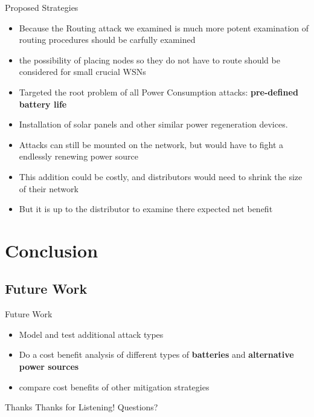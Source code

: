 \documentclass{beamer}
\begin{document}
\begin{frame}{Proposed Strategies}

\begin{itemize}

	\item Because the Routing attack we examined is much more potent examination of routing procedures should be carfully examined
	\item the possibility of placing nodes so they do not have to route should be considered for small crucial WSNs
	\item Targeted the root problem of all Power Consumption attacks: \textbf{pre-defined battery life}
	\item Installation of solar panels and other similar power regeneration devices.
	\item Attacks can still be mounted on the network, but would have to fight a endlessly renewing power source 
	\item This addition could be costly, and distributors would need to shrink the size of their network
	\item But it is up to the distributor to examine there expected net benefit
	
\end{itemize}

\end{frame}

\section{Conclusion}

\subsection{Future Work}
\begin{frame}{Future Work}
\begin{itemize}

	\item Model and test additional attack types 
	\item Do a cost benefit analysis of different types of \textbf{batteries} and \textbf{alternative power sources}
	\item compare cost benefits of other mitigation strategies 

\end{itemize}
\end{frame}	

\begin{frame}{Thanks}
	\centering
	\huge{Thanks for Listening! Questions?}
\end{frame}
\end{document}

